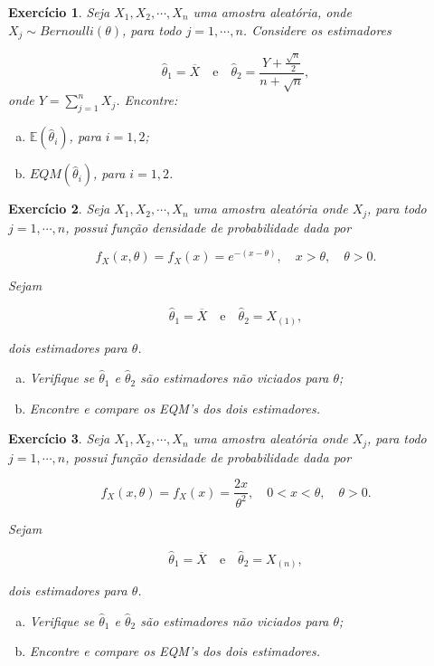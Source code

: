 \documentclass[letter,11pt]{article}
\newtheorem{exer}{Exercício}
\newcommand{\E}{\mathbb{E}}
\begin{document}

\begin{exer} \rm
Seja $X_1,X_2,\cdots,X_n$ uma amostra aleatória, onde $X_j\sim Bernoulli(\theta)$, para todo $j=1,\cdots,n$. Considere os estimadores

\[\widehat{\theta}_1=\overline{X}\quad\mbox{e}\quad\widehat{\theta}_2=\frac{Y+\frac{\sqrt{n}}{2}}{n+\sqrt{n}},\]
onde $Y=\sum_{j=1}^{n}X_j$. Encontre:
\begin{enumerate}[a)]
\item $\E(\widehat{\theta}_i)$, para $i=1,2$;

\item $EQM(\widehat{\theta}_i)$, para $i=1,2$.
\end{enumerate}
\end{exer}

\begin{exer} \rm
Seja $X_1,X_2,\cdots,X_n$ uma amostra aleatória onde $X_j$, para todo $j=1,\cdots,n$, possui função densidade de probabilidade dada por

\[f_X(x,\theta)=f_X(x)=e^{-(x-\theta)},\quad x>\theta,\quad \theta>0.\]

Sejam

\[\widehat{\theta}_1=\overline{X}\quad\mbox{e}\quad\widehat{\theta}_2=X_{(1)},\]

\noindent dois estimadores para $\theta$.

\begin{enumerate}[a)]
\item Verifique se $\widehat{\theta}_1$ e $\widehat{\theta}_2$ são estimadores não viciados para $\theta$;

\item Encontre e compare os EQM's dos dois estimadores.
\end{enumerate}
\end{exer}

\begin{exer} \rm
Seja $X_1,X_2,\cdots,X_n$ uma amostra aleatória onde $X_j$, para todo $j=1,\cdots,n$, possui função densidade de probabilidade dada por

$$f_X(x,\theta)=f_X(x)=\frac{2x}{\theta^2},\quad 0<x<\theta,\quad \theta>0.$$

Sejam

$$\widehat{\theta}_1=\overline{X}\quad\mbox{e}\quad\widehat{\theta}_2=X_{(n)},$$

\noindent dois estimadores para $\theta$.

\begin{enumerate}[a)]
\item Verifique se $\widehat{\theta}_1$ e $\widehat{\theta}_2$ são estimadores não viciados para $\theta$;

\item Encontre e compare os EQM's dos dois estimadores.
\end{enumerate}
\end{exer}
\end{document}
